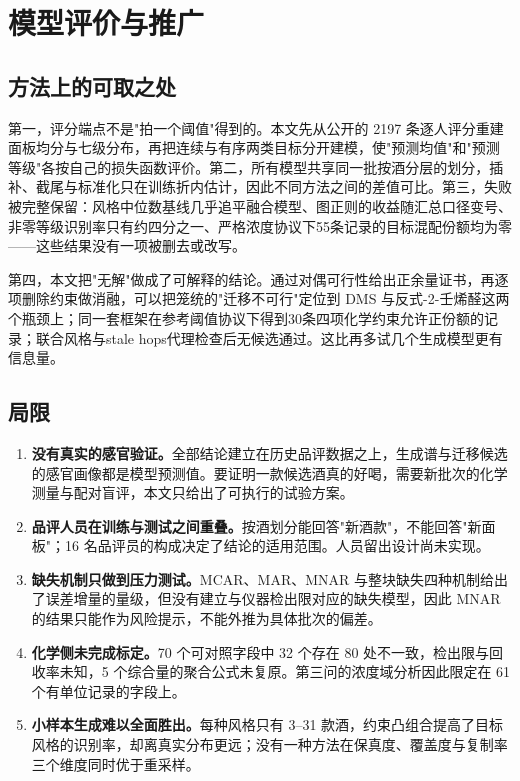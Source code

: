 \section{模型评价与推广}\label{sec:eval}

\subsection{方法上的可取之处}

第一，评分端点不是"拍一个阈值"得到的。本文先从公开的 2197 条逐人评分重建面板均分与七级分布，再把连续与有序两类目标分开建模，使"预测均值"和"预测等级"各按自己的损失函数评价。第二，所有模型共享同一批按酒分层的划分，插补、截尾与标准化只在训练折内估计，因此不同方法之间的差值可比。第三，失败被完整保留：风格中位数基线几乎追平融合模型、图正则的收益随汇总口径变号、非零等级识别率只有约四分之一、严格浓度协议下55条记录的目标混配份额均为零——这些结果没有一项被删去或改写。

第四，本文把"无解"做成了可解释的结论。通过对偶可行性给出正余量证书，再逐项删除约束做消融，可以把笼统的"迁移不可行"定位到 DMS 与反式-2-壬烯醛这两个瓶颈上；同一套框架在参考阈值协议下得到30条四项化学约束允许正份额的记录；联合风格与stale hops代理检查后无候选通过。这比再多试几个生成模型更有信息量。

\subsection{局限}

\begin{enumerate}
\item[\textbf{L1}] \textbf{没有真实的感官验证。}全部结论建立在历史品评数据之上，生成谱与迁移候选的感官画像都是模型预测值。要证明一款候选酒真的好喝，需要新批次的化学测量与配对盲评，本文只给出了可执行的试验方案。
\item[\textbf{L2}] \textbf{品评人员在训练与测试之间重叠。}按酒划分能回答"新酒款"，不能回答"新面板"；16 名品评员的构成决定了结论的适用范围。人员留出设计尚未实现。
\item[\textbf{L3}] \textbf{缺失机制只做到压力测试。}MCAR、MAR、MNAR 与整块缺失四种机制给出了误差增量的量级，但没有建立与仪器检出限对应的缺失模型，因此 MNAR 的结果只能作为风险提示，不能外推为具体批次的偏差。
\item[\textbf{L4}] \textbf{化学侧未完成标定。}70 个可对照字段中 32 个存在 80 处不一致，检出限与回收率未知，5 个综合量的聚合公式未复原。第三问的浓度域分析因此限定在 61 个有单位记录的字段上。
\item[\textbf{L5}] \textbf{小样本生成难以全面胜出。}每种风格只有 3--31 款酒，约束凸组合提高了目标风格的识别率，却离真实分布更远；没有一种方法在保真度、覆盖度与复制率三个维度同时优于重采样。
\end{enumerate}

